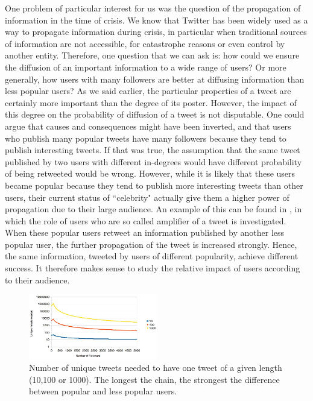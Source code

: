 \documentclass[conference]{IEEEtran}
\begin{document}
One problem of particular interest for us was the question of the propagation of information in the time of crisis. We know that Twitter has been widely used as a way to propagate information during crisis, in particular when traditional sources of information are not accessible, for catastrophe reasons or even control by another entity. Therefore, one question that we can ask is: how could we ensure the diffusion of an important information to a wide range of users? Or more generally, how users with many followers are better at diffusing information than less popular users? As we said earlier, the particular properties of a tweet are certainly more important than the degree of its poster. However, the impact of this degree on the probability of diffusion of a tweet is not disputable. One could argue that causes and consequences might have been inverted, and that users who publish many popular tweets have many followers because they tend to publish interesting tweets. If that was true, the assumption that the same tweet published by two users with different in-degrees would have different probability of being retweeted would be wrong. However, while it is likely that these users became popular because they tend to publish more interesting tweets than other users, their current status of ``celebrity" actually give them a higher power of propagation due to their large audience. An example of this can be found in \cite{tinati2012identifying}, in which the role of users who are so called amplifier of a tweet is investigated. When these popular users retweet an information published by another less popular user, the further propagation of the tweet is increased strongly. Hence, the same information, tweeted by users of different popularity, achieve different success. It therefore makes sense to study the relative impact of users according to their audience.

\begin{figure}[h]
\includegraphics[width=0.5\textwidth]{data/1outOf.jpg}
\caption{Number of unique tweets needed to have one tweet of a given length (10,100 or 1000). The longest the chain, the strongest the difference between popular and less popular users.}

    \label{fig:1outOf}
\end{figure}
\end{document}
